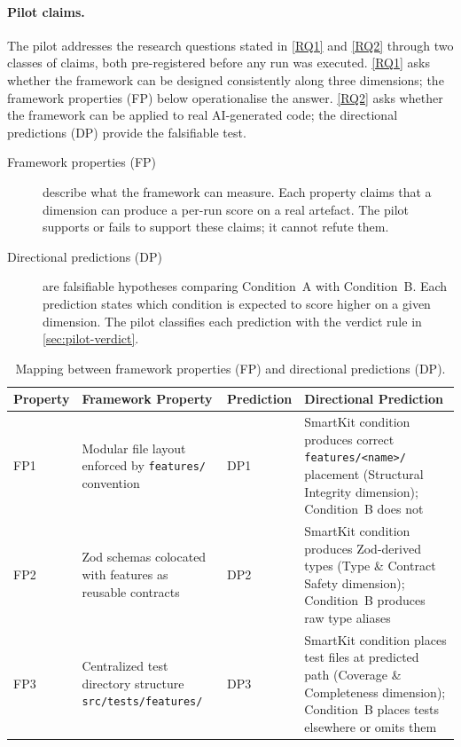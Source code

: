 \documentclass[12pt,a4paper]{report}
\DeclareRobustCommand{\filename}[1]{\bgroup\urlstyle{tt}\nolinkurl{#1}\egroup}
\begin{document}
\paragraph{Pilot claims.}
\label{sec:pilot-claims}
The pilot addresses the research questions stated in \autoref{RQ1} and \autoref{RQ2} through two classes of
claims, both pre-registered before any run was executed. \autoref{RQ1} asks whether the framework can be designed consistently along three dimensions; the framework properties (FP) below operationalise the answer. \autoref{RQ2} asks whether the framework can be applied to real AI-generated code; the directional predictions (DP) provide the falsifiable test.

\begin{description}
  \item[Framework properties (FP)] describe what the framework can
    measure. Each property claims that a dimension can produce a
    per-run score on a real artefact. The pilot supports or fails to
    support these claims; it cannot refute them.
  \item[Directional predictions (DP)] are falsifiable hypotheses
    comparing Condition~A with Condition~B. Each prediction states which
    condition is expected to score higher on a given dimension. The
    pilot classifies each prediction with the verdict rule in
    \autoref{sec:pilot-verdict}.
\end{description}

\begin{table}[H]
\centering
\footnotesize
\renewcommand{\arraystretch}{1.3}
\caption{Mapping between framework properties (FP) and directional predictions (DP).}
\label{tab:fp-dp-mapping}
\begin{tabular}{@{}p{1.2cm}p{4.5cm}p{1.2cm}p{5.5cm}@{}}
\toprule
\textbf{Property} & \textbf{Framework Property} & \textbf{Prediction} & \textbf{Directional Prediction} \\
\midrule
FP1 & Modular file layout enforced by \filename{features/} convention & DP1 & SmartKit condition produces correct \filename{features/<name>/} placement (Structural Integrity dimension); Condition~B does not \\
\midrule
FP2 & Zod schemas colocated with features as reusable contracts & DP2 & SmartKit condition produces Zod-derived types (Type \& Contract Safety dimension); Condition~B produces raw type aliases \\
\midrule
FP3 & Centralized test directory structure \filename{src/tests/features/} & DP3 & SmartKit condition places test files at predicted path (Coverage \& Completeness dimension); Condition~B places tests elsewhere or omits them \\
\bottomrule
\end{tabular}
\end{table}
\end{document}
